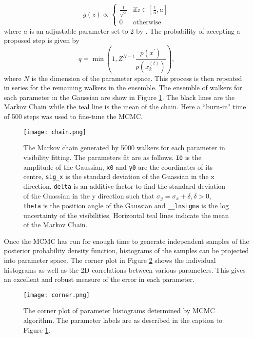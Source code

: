 \begin{equation}
\label{eq:MCMC_g}
g(z) \propto 
\begin{cases}
\frac{1}{\sqrt{z}} & \mbox{if} z \in \left[\frac{1}{a}, a \right] \\
0 & \mbox{otherwise}
\end{cases}
\end{equation}
where $a$ is an adjustable parameter set to 2 by \cite{Goodman2010}. The probability of accepting a proposed step is given by
\begin{equation}
\label{eq:MCMC_stretch_newstate}
q = \min \left(1, Z^{N-1} \frac{p(x^\prime)}{p(x_k^{(t)})}\right),
\end{equation} 
where $N$ is the dimension of the parameter space. This process is then repeated in series for the remaining walkers in the ensemble.
The ensemble of walkers for each parameter in the Gaussian are show in Figure \ref{fig:MCMCchain}. The black lines are the Markov Chain while the teal line is the mean of the chain. Here a ``burn-in" time of 500 steps was used to fine-tune the MCMC. 
\begin{figure}[ht]
\centering
\texttt{[image: chain.png]}
\caption[The Markov chain generated by 5000 walkers for each parameter in visibility fitting.]{The Markov chain generated by 5000 walkers for each parameter in visibility fitting. The parameters fit are as follows. \texttt{I0} is the amplitude of the Gaussian, \texttt{x0} and \texttt{y0} are the coordinates of its centre, \texttt{sig\_x} is the standard deviation of the Guassian in the x direction, \texttt{delta} is an additive factor to find the standard deviation of the Guassian in the y direction such that $\sigma_y = \sigma_x + \delta, \delta > 0$, \texttt{theta} is the position angle of the Gaussian and \texttt{\_\_lnsigma} is the log uncertainty of the visibilities. Horizontal teal lines indicate the mean of the Markov Chain.}
\label{fig:MCMCchain}
\end{figure}

Once the MCMC has run for enough time to generate independent samples of the posterior probability density function, histograms of the samples can be projected into parameter space. The corner plot in Figure \ref{fig:MCMCcorner} shows the individual histograms as well as the 2D correlations between various parameters. This gives an excellent and robust measure of the error in each parameter.

\begin{figure}[ht]
\centering
\texttt{[image: corner.png]}
\caption[A Corner plot of parameter histograms determined by MCMC algorithm.]{The corner plot of parameter histograms determined by MCMC algorithm. The parameter labels are as described in the caption to Figure \ref{fig:MCMCchain}.}
\label{fig:MCMCcorner}
\end{figure}

